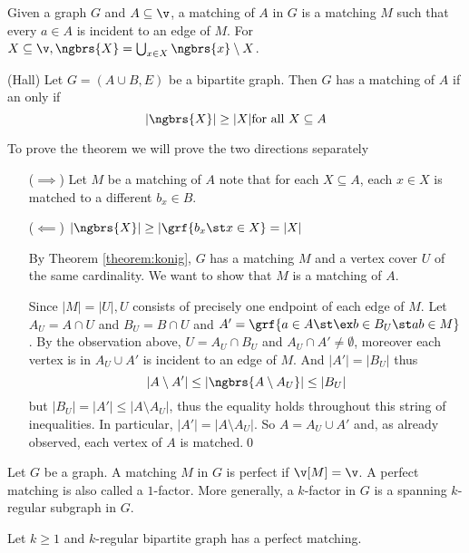 Given a graph $G$ and $A \subseteq \v$, a matching of $A$ in $G$ is a matching $M$ such that every $a \in A$ is incident to an edge of $M$. For $X \subseteq \v, \ngbrs{X} = \bigcup_{x \in X} \ngbrs{x} \setminus X$.
\begin{customtheorem}{(Hall)}
\label{theorem:hall}
    Let $G = (A \cup B, E)$ be a bipartite graph. Then $G$ has a matching of $A$ if an only if
    \begin{equation*}
        |\ngbrs{X}| \geq |X| \text{for all $X \subseteq A$}
    \end{equation*}
\end{customtheorem}
\begin{prf}
    To prove the theorem we will prove the two directions separately
    \begin{itemize}
        \item [($\implies$)] Let $M$ be a matching of $A$ note that for each $X \subseteq A$, each $x \in X$ is matched to a different $b_x \in B$.
        \item [($\impliedby$)] $|\ngbrs{X}| \geq |\grf{b_x \st x \in X} = |X|$
        
        By Theorem \ref{theorem:konig}, $G$ has a matching $M$ and a vertex cover $U$ of the same cardinality. We want to show that $M$ is a matching of $A$.

        Since $|M| = |U|, U$ consists of precisely one endpoint of each edge of $M$. Let $A_U = A \cap U$ and $B_U = B \cap U$ and $A' = \grf{a \in A \st \ex b \in B_U \st ab \in M}$. By the observation above, $U = A_U \cap B_U$ and $A_U \cap A' \neq \emptyset$, moreover each vertex is in $A_U \cup A'$ is incident to an edge of $M$. And $|A'| = |B_U|$ thus
        \begin{equation*}
            |A \setminus A'| \leq |\ngbrs{A \setminus A_U}| \leq |B_U|
        \end{equation*}
        but $|B_U| = |A'| \leq |A \setminus A_U|$, thus the equality holds throughout this string of inequalities. In particular, $|A'| = |A \setminus A_U|$. So $A = A_U \cup A'$ and, as already observed, each vertex of $A$ is matched.\qed
    \end{itemize}
\end{prf}
Let $G$ be a graph. A matching $M$ in $G$ is perfect if $\v[M] = \v$. A perfect matching is also called a $1$-factor. More generally, a $k$-factor in $G$ is a spanning $k$-regular subgraph in $G$.
\begin{customcorollary}{2.4}
\label{corollary:2.4}
    Let $k \geq 1$ and $k$-regular bipartite graph has a perfect matching.
\end{customcorollary}
